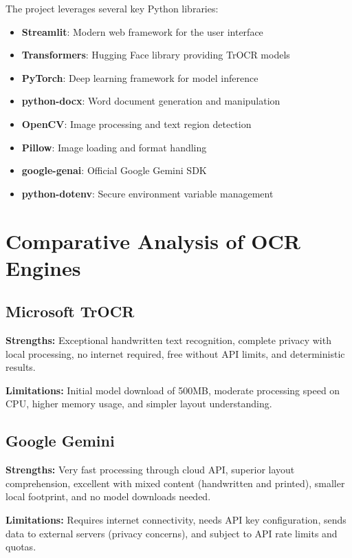 \documentclass[12pt,a4paper]{article}
\begin{document}
The project leverages several key Python libraries:

\begin{itemize}
    \item \textbf{Streamlit}: Modern web framework for the user interface
    \item \textbf{Transformers}: Hugging Face library providing TrOCR models
    \item \textbf{PyTorch}: Deep learning framework for model inference
    \item \textbf{python-docx}: Word document generation and manipulation
    \item \textbf{OpenCV}: Image processing and text region detection
    \item \textbf{Pillow}: Image loading and format handling
    \item \textbf{google-genai}: Official Google Gemini SDK
    \item \textbf{python-dotenv}: Secure environment variable management
\end{itemize}

\section{Comparative Analysis of OCR Engines}

\subsection{Microsoft TrOCR}
\textbf{Strengths:} Exceptional handwritten text recognition, complete privacy with local processing, no internet required, free without API limits, and deterministic results.

\textbf{Limitations:} Initial model download of 500MB, moderate processing speed on CPU, higher memory usage, and simpler layout understanding.

\subsection{Google Gemini}
\textbf{Strengths:} Very fast processing through cloud API, superior layout comprehension, excellent with mixed content (handwritten and printed), smaller local footprint, and no model downloads needed.

\textbf{Limitations:} Requires internet connectivity, needs API key configuration, sends data to external servers (privacy concerns), and subject to API rate limits and quotas.
\end{document}
